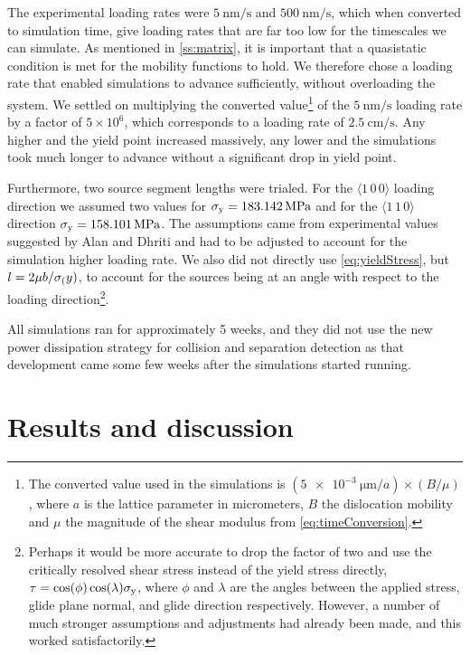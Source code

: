 The experimental loading rates were $\SI{5}{\nano\metre\per\second}$ and $\SI{500}{\nano\metre\per\second}$, which when converted to simulation time, give loading rates that are far too low for the timescales we can simulate. As mentioned in \cref{ss:matrix}, it is important that a quasistatic condition is met for the mobility functions to hold. We therefore chose a loading rate that enabled simulations to advance sufficiently, without overloading the system. We settled on multiplying the converted value\footnote{The converted value used in the simulations is $\left(\SI{5e-3}{\micro\metre}/a\right) \times \left(B /  \mu \right)$, where $a$ is the lattice parameter in micrometers, $B$ the dislocation mobility and $ \mu $ the magnitude of the shear modulus from \cref{eq:timeConversion}.} of the $\SI{5}{\nano\metre\per\second}$ loading rate by a factor of $5 \times 10^6$, which corresponds to a loading rate of $\SI{2.5}{\centi\metre\per\second}$. Any higher and the yield point increased massively, any lower and the simulations took much longer to advance without a significant drop in yield point.

Furthermore, two source segment lengths were trialed. For the $\langle 1\, 0\, 0 \rangle$ loading direction we assumed two values for $\sigma_{\textrm{y}} = \SI{183, 142}{\mega\pascal}$ and for the $\langle 1\, 1\, 0 \rangle$ direction $\sigma_{\textrm{y}} = \SI{158, 101}{\mega\pascal}$. The assumptions came from experimental values suggested by Alan and Dhriti and had to be adjusted to account for the simulation higher loading rate. We also did not directly use \cref{eq:yieldStress}, but $l = 2 \mu b / \sigma_{\textrm{(}}y)$, to account for the sources being at an angle with respect to the loading direction\footnote{Perhaps it would be more accurate to drop the factor of two and use the critically resolved shear stress instead of the yield stress directly, $\tau = \cos(\phi)\cos(\lambda) \sigma_{\textrm{y}}$, where $\phi$ and $\lambda$ are the angles between the applied stress, glide plane normal, and glide direction respectively. However, a number of much stronger assumptions and adjustments had already been made, and this worked satisfactorily.}.

All simulations ran for approximately 5 weeks, and they did not use the new power dissipation strategy for collision and separation detection as that development came some few weeks after the simulations started running.

\section{Results and discussion}
\label{s:NiResults}

